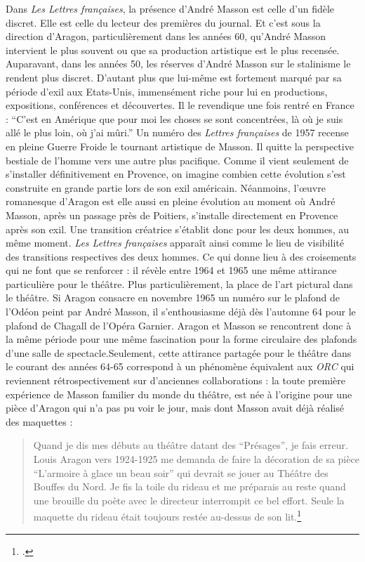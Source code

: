 	Dans \emph{Les Lettres françaises}, la présence d’André Masson est celle d’un fidèle discret. Elle est celle du lecteur des premières du journal. Et c’est sous la direction d’Aragon, particulièrement dans les années 60, qu’André Masson intervient le plus souvent ou que sa production artistique est le plus recensée. Auparavant, dans les années 50, les réserves d’André Masson sur le stalinisme le rendent plus discret. D’autant plus que lui-même est fortement marqué par sa période d’exil aux Etats-Unis, immensément riche pour lui en productions, expositions, conférences et découvertes. Il le revendique une fois rentré en France : \enquote{C’est en Amérique que pour moi les choses se sont concentrées, là où je suis allé le plus loin, où j’ai mûri.} Un numéro des \emph{Lettres françaises} de 1957 recense en pleine Guerre Froide le tournant artistique de Masson. Il quitte la perspective bestiale de l’homme vers une autre plus pacifique. Comme il vient seulement de s’installer définitivement en Provence, on imagine combien cette évolution s’est construite en grande partie lors de son exil américain. Néanmoins, l’\oe{}uvre romanesque d’Aragon est elle aussi en pleine évolution au moment où André Masson, après un passage près de Poitiers, s’installe directement en Provence après son exil. Une transition créatrice s’établit donc pour les deux hommes, au même moment. \emph{Les Lettres françaises} apparaît ainsi comme le lieu de visibilité des transitions respectives des deux hommes. Ce qui donne lieu à des croisements qui ne font que se renforcer : il révèle entre 1964 et 1965 une même attirance particulière pour le théâtre. Plus particulièrement, la place de l’art pictural dans le théâtre. Si Aragon consacre en novembre 1965 un numéro sur le plafond de l’Odéon peint par André Masson, il s’enthousiasme déjà dès l’automne 64 pour le plafond de Chagall de l’Opéra Garnier. Aragon et Masson se rencontrent donc à la même période pour une même fascination pour la forme circulaire des plafonds d’une salle de spectacle.Seulement, cette attirance partagée pour le théâtre dans le courant des années 64-65 correspond à un phénomène équivalent aux \emph{ORC} qui reviennent rétrospectivement sur d'anciennes collaborations : la toute première expérience de Masson familier du monde du théâtre, est née à l'origine pour une pièce d'Aragon qui n'a pas pu voir le jour, mais dont Masson avait déjà réalisé des maquettes : 
\begin{quote}
Quand je dis mes débuts au théâtre datant des \enquote{Présages}, je fais erreur. Louis Aragon vers 1924-1925 me demanda de faire la décoration de sa pièce \enquote{L'armoire à glace un beau soir} qui devrait se jouer au Théâtre des Bouffes du Nord. Je fis la toile du rideau et me préparais au reste quand une brouille du poète avec le directeur interrompit ce bel effort. Seule la maquette du rideau était toujours restée au-dessus de son lit.\footcite[p19]{catalogue}
\end{quote}
	
